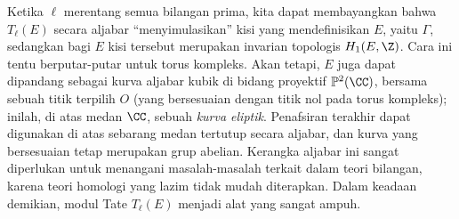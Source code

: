 \begin{example}
Ketika $\ell$ merentang semua bilangan prima, kita dapat membayangkan bahwa $T_\ell(E)$ secara aljabar ``menyimulasikan'' kisi yang mendefinisikan $E$, yaitu $\Gamma$, sedangkan bagi $E$ kisi tersebut merupakan invarian topologis $H_1(E, \Z)$. Cara ini tentu berputar-putar untuk torus kompleks. Akan tetapi, $E$ juga dapat dipandang sebagai kurva aljabar kubik di bidang proyektif $\mathbb{P}^2(\CC)$, bersama sebuah titik terpilih $O$ (yang bersesuaian dengan titik nol pada torus kompleks); inilah, di atas medan $\CC$, sebuah \emph{kurva eliptik}. Penafsiran terakhir dapat digunakan di atas sebarang medan tertutup secara aljabar, dan kurva yang bersesuaian tetap merupakan grup abelian. Kerangka aljabar ini sangat diperlukan untuk menangani masalah-masalah terkait dalam teori bilangan, karena teori homologi yang lazim tidak mudah diterapkan. Dalam keadaan demikian, modul Tate $T_\ell(E)$ menjadi alat yang sangat ampuh.
\end{example}
